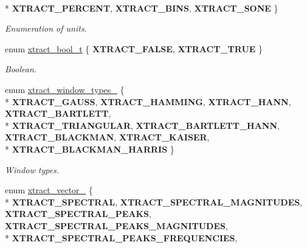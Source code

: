 \begin{DoxyCompactItemize}
\\*
{\bfseries X\-T\-R\-A\-C\-T\-\_\-\-P\-E\-R\-C\-E\-N\-T}, 
{\bfseries X\-T\-R\-A\-C\-T\-\_\-\-B\-I\-N\-S}, 
{\bfseries X\-T\-R\-A\-C\-T\-\_\-\-S\-O\-N\-E}
 \}
\begin{DoxyCompactList}\small\item\em Enumeration of units. \end{DoxyCompactList}\item 
enum \hyperlink{group__libxtract_ga7fea2e9d509c5c5f360e81fea364e0f4}{xtract\-\_\-bool\-\_\-t} \{ {\bfseries X\-T\-R\-A\-C\-T\-\_\-\-F\-A\-L\-S\-E}, 
{\bfseries X\-T\-R\-A\-C\-T\-\_\-\-T\-R\-U\-E}
 \}
\begin{DoxyCompactList}\small\item\em Boolean. \end{DoxyCompactList}\item 
enum \hyperlink{group__libxtract_gac1b90bd093b011dc42bcd227fb09d395}{xtract\-\_\-window\-\_\-types\-\_\-} \{ \\*
{\bfseries X\-T\-R\-A\-C\-T\-\_\-\-G\-A\-U\-S\-S}, 
{\bfseries X\-T\-R\-A\-C\-T\-\_\-\-H\-A\-M\-M\-I\-N\-G}, 
{\bfseries X\-T\-R\-A\-C\-T\-\_\-\-H\-A\-N\-N}, 
{\bfseries X\-T\-R\-A\-C\-T\-\_\-\-B\-A\-R\-T\-L\-E\-T\-T}, 
\\*
{\bfseries X\-T\-R\-A\-C\-T\-\_\-\-T\-R\-I\-A\-N\-G\-U\-L\-A\-R}, 
{\bfseries X\-T\-R\-A\-C\-T\-\_\-\-B\-A\-R\-T\-L\-E\-T\-T\-\_\-\-H\-A\-N\-N}, 
{\bfseries X\-T\-R\-A\-C\-T\-\_\-\-B\-L\-A\-C\-K\-M\-A\-N}, 
{\bfseries X\-T\-R\-A\-C\-T\-\_\-\-K\-A\-I\-S\-E\-R}, 
\\*
{\bfseries X\-T\-R\-A\-C\-T\-\_\-\-B\-L\-A\-C\-K\-M\-A\-N\-\_\-\-H\-A\-R\-R\-I\-S}
 \}
\begin{DoxyCompactList}\small\item\em Window types. \end{DoxyCompactList}\item 
enum \hyperlink{group__libxtract_ga7347f34a9566e36aa41d95c8838f32cd}{xtract\-\_\-vector\-\_\-} \{ \\*
{\bfseries X\-T\-R\-A\-C\-T\-\_\-\-S\-P\-E\-C\-T\-R\-A\-L}, 
{\bfseries X\-T\-R\-A\-C\-T\-\_\-\-S\-P\-E\-C\-T\-R\-A\-L\-\_\-\-M\-A\-G\-N\-I\-T\-U\-D\-E\-S}, 
{\bfseries X\-T\-R\-A\-C\-T\-\_\-\-S\-P\-E\-C\-T\-R\-A\-L\-\_\-\-P\-E\-A\-K\-S}, 
{\bfseries X\-T\-R\-A\-C\-T\-\_\-\-S\-P\-E\-C\-T\-R\-A\-L\-\_\-\-P\-E\-A\-K\-S\-\_\-\-M\-A\-G\-N\-I\-T\-U\-D\-E\-S}, 
\\*
{\bfseries X\-T\-R\-A\-C\-T\-\_\-\-S\-P\-E\-C\-T\-R\-A\-L\-\_\-\-P\-E\-A\-K\-S\-\_\-\-F\-R\-E\-Q\-U\-E\-N\-C\-I\-E\-S}, 

\end{DoxyCompactItemize}
